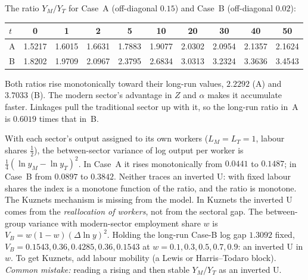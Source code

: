\documentclass[../solutions_manual.tex]{subfiles}
\begin{document}
 The ratio $Y_M/Y_T$ for Case~A (off-diagonal $0.15$) and Case~B (off-diagonal $0.02$):
\begin{center}
\begin{tabular}{lccccccccc}
\toprule
$t$ & 0 & 1 & 2 & 5 & 10 & 20 & 30 & 40 & 50\\
\midrule
A & 1.5217 & 1.6015 & 1.6631 & 1.7883 & 1.9077 & 2.0302 & 2.0954 & 2.1357 & 2.1624\\
B & 1.8202 & 1.9709 & 2.0967 & 2.3795 & 2.6834 & 3.0313 & 3.2324 & 3.3636 & 3.4543\\
\bottomrule
\end{tabular}
\end{center}
\begin{center}
\end{center}
Both ratios rise monotonically toward their long-run values, $2.2292$ (A) and $3.7033$ (B). The modern sector's advantage in $Z$ and $\alpha$ makes it accumulate faster. Linkages pull the traditional sector up with it, so the long-run ratio in~A is $0.6019$ times that in~B.

 With each sector's output assigned to its own workers ($L_M = L_T = 1$, labour shares $\frac12$), the between-sector variance of log output per worker is $\frac14(\ln y_M - \ln y_T)^2$. In Case~A it rises monotonically from $0.0441$ to $0.1487$; in Case~B from $0.0897$ to $0.3842$. Neither traces an inverted U: with fixed labour shares the index is a monotone function of the ratio, and the ratio is monotone. The Kuznets mechanism is missing from the model. In Kuznets the inverted U comes from the \emph{reallocation of workers}, not from the sectoral gap. The between-group variance with modern-sector employment share $w$ is $V_B = w(1-w)(\Delta\ln y)^2$. Holding the long-run Case-B log gap $1.3092$ fixed, $V_B = 0.1543, 0.36, 0.4285, 0.36, 0.1543$ at $w = 0.1, 0.3, 0.5, 0.7, 0.9$: an inverted U in $w$. To get Kuznets, add labour mobility (a Lewis or Harris--Todaro block). \emph{Common mistake:} reading a rising and then stable $Y_M/Y_T$ as an inverted U.
\end{document}
